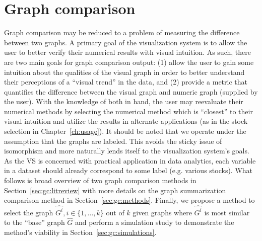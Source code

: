 \chapter{Graph comparison \label{ch:gc}}

Graph comparison may be reduced to a problem of measuring the difference 
between two graphs. 
A primary goal of the visualization system is to allow the user to better 
verify their numerical results with visual intuition. As such, there are two 
main goals for graph comparison output: (1) allow the user to gain some 
intuition about the qualities of the visual graph in order to better understand 
their perceptions of a ``visual trend'' in the data, and (2) provide a metric 
that quantifies the difference between the visual graph and numeric graph 
(supplied by the user). With the knowledge of both in hand, the user may 
reevaluate their numerical methods by selecting the numerical method which is 
``closest'' to their visual intuition and utilize the results in alternate 
applications (as in the stock selection in Chapter~\ref{ch:usage}). 
It should be noted that we operate under 
the assumption that the graphs are labeled. This avoids the sticky issue of 
isomorphism and more naturally lends itself to the visualization system's 
goals. As the VS is concerned with practical application in data 
analytics, each variable in a dataset should already correspond to some label 
(e.g. various stocks).
What follows is broad overview of two graph comparison methods in 
Section~\ref{sec:gc:litreview} with more details on the graph summarization 
comparison method in Section~\ref{sec:gc:methods}. Finally, we propose a method 
to select the graph $\hat{G^i}, i \in \{1,...,k\}$ out of $k$ given graphs 
where $\hat{G^i}$ is most similar to the ``base'' graph $\hat{G}$ and perform 
a simulation study to demonstrate the method's viability in 
Section~\ref{sec:gc:simulations}.



